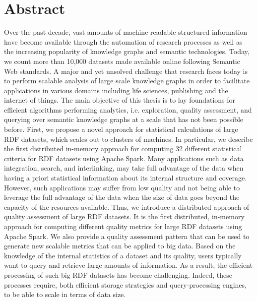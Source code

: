 \chapter*{Abstract}

Over the past decade, vast amounts of machine-readable structured information have become available through the automation of research processes as well as the increasing popularity of knowledge graphs and semantic technologies. 
Today, we count more than 10,000 datasets made available online following Semantic Web standards.
A major and yet unsolved challenge that research faces today is to perform scalable analysis of large scale knowledge graphs in order to facilitate applications in various domains including life sciences, publishing and the internet of things.
The main objective of this thesis is to lay foundations for efficient algorithms performing analytics, i.e. exploration, quality assessment, and querying over semantic knowledge graphs at a scale that has not been possible before.
First, we propose
a novel approach for statistical calculations of large RDF datasets, which scales out to clusters of machines. 
In particular, we describe the first distributed in-memory approach for computing 32 different statistical criteria for RDF datasets using Apache Spark.
Many applications such as data integration, search, and interlinking, may take full advantage of the data when having a priori statistical information about its internal structure and coverage.
However, such applications may suffer from low quality and not being able to leverage the full advantage of the data when the size of data goes beyond the capacity of the resources available.
Thus, we introduce 
a distributed approach of quality assessment of large RDF datasets.
It is the first distributed, in-memory approach for computing different quality metrics for large RDF datasets using Apache Spark. We also provide a quality assessment pattern that can be used to generate new scalable metrics that can be applied to big data.
Based on the knowledge of the internal statistics of a dataset and its quality, users typically want to query and retrieve large amounts of information.
As a result, the efficient processing of such big RDF datasets has become challenging.
Indeed, these processes require, both efficient storage strategies and query-processing engines, to be able to scale in terms of data size.
